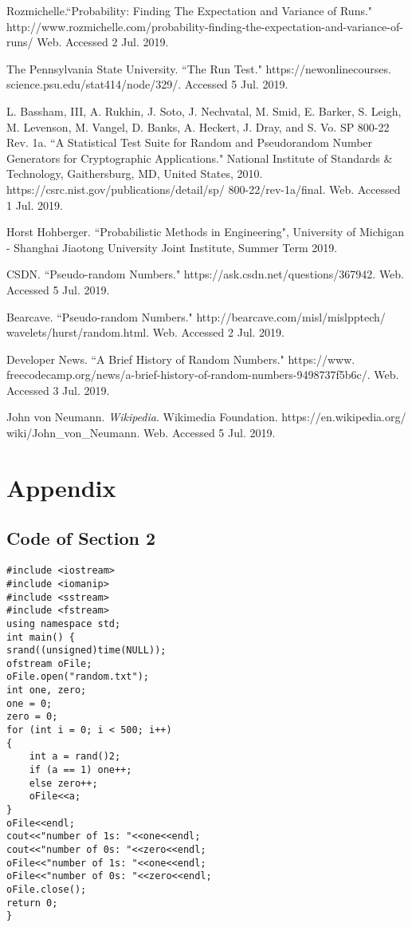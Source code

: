 \documentclass[a4paper,12pt]{article}
\begin{document}
\noindent [2] Rozmichelle.``Probability: Finding The Expectation and Variance of Runs." http://www.rozmichelle.com/probability-finding-the-expectation-and-variance-of-runs/ Web. Accessed 2 Jul. 2019.


\noindent [3] The Pennsylvania State University. ``The Run Test." 
https://newonlinecourses.\\science.psu.edu/stat414/node/329/. Accessed 5 Jul. 2019.

\noindent [4] L. Bassham, III, A. Rukhin, J. Soto, J. Nechvatal, M. Smid, E. Barker, S. Leigh, M. Levenson, M. Vangel,
D. Banks, A. Heckert, J. Dray, and S. Vo. SP 800-22 Rev. 1a. ``A Statistical Test Suite for Random
and Pseudorandom Number Generators for Cryptographic Applications." National Institute of Standards $\&$
Technology, Gaithersburg, MD, United States, 2010. https://csrc.nist.gov/publications/detail/sp/
800-22/rev-1a/final. Web. Accessed 1 Jul. 2019.

\noindent [5] Horst Hohberger. ``Probabilistic Methods in Engineering", University of Michigan - Shanghai Jiaotong University
Joint Institute, Summer Term 2019.

\noindent [6] CSDN. ``Pseudo-random Numbers." https://ask.csdn.net/questions/367942. Web. Accessed 5 Jul. 2019.


\noindent [7] Bearcave. ``Pseudo-random Numbers." http://bearcave.com/misl/misl{\textunderscore}pptech/ \\ wavelets/hurst/random.html. Web. Accessed 2 Jul. 2019.

\noindent [8] Developer News. ``A Brief History of Random Numbers." https://www.\\freecodecamp.org/news/a-brief-history-of-random-numbers-9498737f5b6c/. Web. Accessed 3 Jul. 2019.

\noindent [9] John von Neumann. \emph{Wikipedia}. Wikimedia Foundation. https://en.wikipedia.org/\\wiki/John\_von\_Neumann. Web. Accessed 5 Jul. 2019.

\newpage
\section{Appendix}
\subsection{Code of Section 2}
\begin{tcolorbox}[title = {Code for Generating Bit-String}]
\begin{verbatim}
#include <iostream>
#include <iomanip>
#include <sstream>
#include <fstream>
using namespace std;
int main() {
srand((unsigned)time(NULL));
ofstream oFile;
oFile.open("random.txt");
int one, zero;
one = 0;
zero = 0;
for (int i = 0; i < 500; i++)
{
    int a = rand()2;
    if (a == 1) one++;
    else zero++;
    oFile<<a;
}
oFile<<endl;
cout<<"number of 1s: "<<one<<endl;
cout<<"number of 0s: "<<zero<<endl;
oFile<<"number of 1s: "<<one<<endl;
oFile<<"number of 0s: "<<zero<<endl;
oFile.close();
return 0;
}
\end{verbatim}
\end{tcolorbox}
\end{document}
